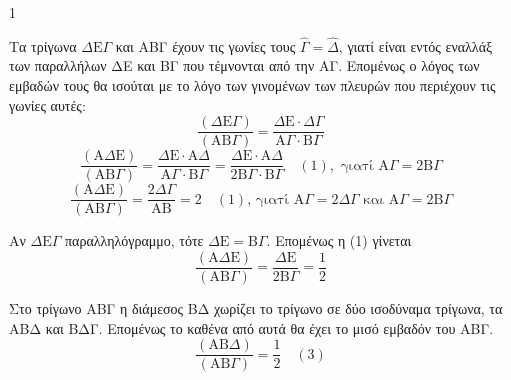 \begin{ylh}{1}
    \item [Ύλη από εικόνα]
\end{ylh}
\begin{figure} %
    \centering
\end{figure}
\begin{rlist}
\item Τα τρίγωνα $\Delta \text{E}\Gamma$ και ΑΒΓ έχουν τις γωνίες τους $\hat{\Gamma}=\hat{\Delta}$, γιατί είναι εντός εναλλάξ των παραλλήλων ΔΕ και ΒΓ που τέμνονται από την ΑΓ. Επομένως ο λόγος των εμβαδών τους θα ισούται με το λόγο των γινομένων των πλευρών που περιέχουν τις γωνίες αυτές:
    \[ \frac{(\Delta \text{E}\Gamma)}{(\text{AB}\Gamma)} = \frac{\Delta \text{E}\cdot \Delta \Gamma}{\text{A}\Gamma \cdot \text{B}\Gamma} \]
    \[ \frac{(\text{A}\Delta \text{E})}{(\text{AB}\Gamma)} = \frac{\Delta \text{E} \cdot \text{A}\Delta}{\text{A}\Gamma \cdot \text{B}\Gamma} = \frac{\Delta \text{E} \cdot \text{A}\Delta}{2\text{B}\Gamma \cdot \text{B}\Gamma} \quad (1), \text{ γιατί } \text{A}\Gamma = 2\text{B}\Gamma \]
    \[ \frac{(\text{A}\Delta \text{E})}{(\text{AB}\Gamma)} = \frac{2\Delta \Gamma}{\text{AB}} = 2 \quad (1) \text{, γιατί } \text{A}\Gamma = 2\Delta \Gamma \text{ και } \text{A}\Gamma = 2\text{B}\Gamma \] 
\item Αν $\Delta \text{E}\Gamma$ παραλληλόγραμμο, τότε $\Delta \text{E} = \text{B}\Gamma$. Επομένως η (1) γίνεται
    \[ \frac{(\text{A}\Delta \text{E})}{(\text{AB}\Gamma)} = \frac{\Delta \text{E}}{2\text{B}\Gamma} = \frac{1}{2} \] 
\item Στο τρίγωνο ΑΒΓ η διάμεσος ΒΔ χωρίζει το τρίγωνο σε δύο ισοδύναμα τρίγωνα, τα ΑΒΔ και ΒΔΓ. Επομένως το καθένα από αυτά θα έχει το μισό εμβαδόν του ΑΒΓ.
    \[ \frac{(\text{AB}\Delta)}{(\text{AB}\Gamma)} = \frac{1}{2} \quad (3) \] 
\end{rlist}
